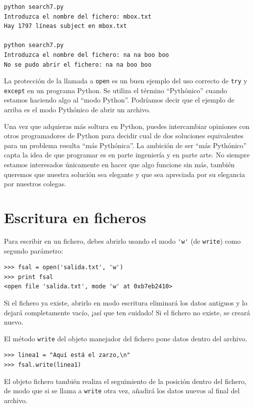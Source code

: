 \beforeverb
\begin{verbatim}
python search7.py
Introduzca el nombre del fichero: mbox.txt
Hay 1797 líneas subject en mbox.txt

python search7.py
Introduzca el nombre del fichero: na na boo boo
No se pudo abrir el fichero: na na boo boo
\end{verbatim}
\afterverb
%
La protección de la llamada a {\tt open} es un buen ejemplo
del uso correcto de {\tt try}
y {\tt except} en un programa Python. Se utiliza el término
``Pythónico'' cuando estamos haciendo algo al ``modo
Python''. Podríamos decir que el ejemplo de arriba es
el modo Pythónico de abrir un archivo.

Una vez que adquieras más soltura en Python, puedes intercambiar
opiniones con otros programadores de Python para decidir
cual de dos soluciones equivalentes para un problema resulta
``más Pythónica''. La ambición de ser ``más Pythónico''
capta la idea de que programar es en parte ingeniería
y en parte arte. No siempre estamos interesados únicamente
en hacer que algo funcione sin más, también queremos que nuestra solución
sea elegante y que sea apreciada por su elegancia
por nuestros colegas.


\section{Escritura en ficheros}


Para escribir en un fichero, debes abrirlo usando el modo
\verb"'w'" (de {\tt write}) como segundo parámetro:

\beforeverb
\begin{verbatim}
>>> fsal = open('salida.txt', 'w')
>>> print fsal
<open file 'salida.txt', mode 'w' at 0xb7eb2410>
\end{verbatim}
\afterverb
%
Si el fichero ya existe, abrirlo en modo escritura eliminará
los datos antiguos y lo dejará completamente vacío, ¡así que ten cuidado!
Si el fichero no existe, se creará nuevo.

El método {\tt write} del objeto manejador del fichero
pone datos dentro del archivo.

\beforeverb
\begin{verbatim}
>>> linea1 = "Aquí está el zarzo,\n"
>>> fsal.write(linea1)
\end{verbatim}
\afterverb
%
El objeto fichero también realiza el seguimiento de la posición dentro del fichero, de modo
que si se llama a {\tt write} otra vez, añadirá los datos nuevos al final del archivo.

